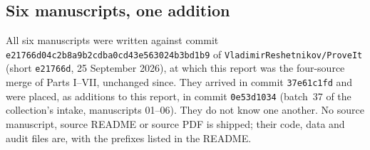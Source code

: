 \documentclass[11pt,letterpaper]{article}
\numberwithin{equation}{section}
\theoremstyle{definition}
\theoremstyle{remark}
\newcommand{\gspin}{\texttt{e21766d}}
\newcommand{\gsfull}{\texttt{e21766d0\allowbreak 4c2b8a9b\allowbreak 2cdba0cd\allowbreak 43e56302\allowbreak 4b3bd1b9}}
\begin{document}
\subsection{Six manuscripts, one addition}\label{univ:gs:sub:provenance}

All six manuscripts were written against commit \gsfull{} of
\texttt{VladimirReshetnikov/ProveIt} (short \gspin, 25 September 2026), at which
this report was the four-source merge of Parts I--VII, unchanged since. They
arrived in commit \texttt{37e61c1fd} and were placed, as additions to this
report, in commit \texttt{0e53d1034} (batch~37 of the collection's intake,
manuscripts 01--06). They do not know one another. No source manuscript, source
README or source PDF is shipped; their code, data and audit files are, with the
prefixes listed in the README.
\end{document}
